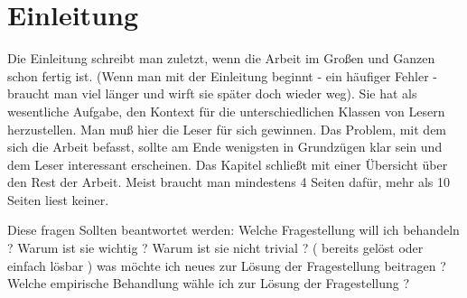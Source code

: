 


\chapter{ Einleitung }

Die Einleitung schreibt man zuletzt, wenn die Arbeit im Großen und Ganzen schon fertig ist.
(Wenn man mit der Einleitung beginnt - ein häufiger Fehler - braucht man viel länger und wirft sie später doch wieder weg). 
Sie hat als wesentliche Aufgabe, den Kontext für die unterschiedlichen Klassen von Lesern herzustellen. Man muß hier die Leser für sich gewinnen. 
Das Problem, mit dem sich die Arbeit befasst, sollte am Ende wenigsten in Grundzügen klar sein und dem Leser interessant erscheinen. 
Das Kapitel schließt mit einer Übersicht über den Rest der Arbeit. Meist braucht man mindestens 4 Seiten dafür, mehr als 10 Seiten liest keiner.

Diese fragen Sollten beantwortet werden:
Welche Fragestellung will ich behandeln ?
Warum ist sie wichtig ?
Warum ist sie nicht trivial ? ( bereits gelöst oder einfach lösbar )
was möchte ich neues zur Lösung der Fragestellung beitragen ?
Welche empirische Behandlung wähle ich zur Lösung der Fragestellung ?

